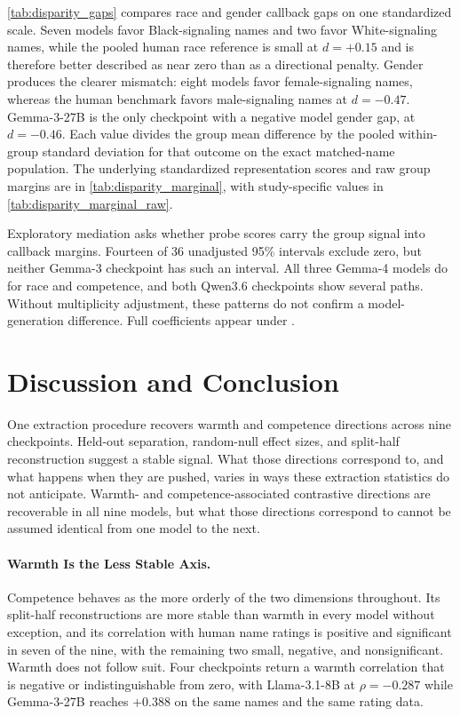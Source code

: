 \documentclass[twocolumn]{article}
\newcommand{\tabledir}{../../results/tables}
\begin{document}
\autoref{tab:disparity_gaps} compares race and gender callback gaps on
one standardized scale. Seven models favor Black-signaling names and two favor
White-signaling names, while the pooled human race reference is small at
$d=+0.15$ and is therefore better described as near zero than as a directional
penalty. Gender produces the clearer mismatch: eight models favor
female-signaling names, whereas the human benchmark favors male-signaling
names at $d=-0.47$. Gemma-3-27B is the only checkpoint with a negative model
gender gap, at $d=-0.46$. Each value divides the group mean difference by the
pooled within-group standard deviation for that outcome on the exact matched-name
population. The
underlying standardized representation scores and raw group margins are in
\autoref{tab:disparity_marginal}, with study-specific values in
\autoref{tab:disparity_marginal_raw}.



Exploratory mediation asks whether probe scores carry the group signal into
callback margins. Fourteen of 36 unadjusted 95\% intervals exclude zero, but
neither Gemma-3 checkpoint has such an interval. All three Gemma-4 models do
for race and competence, and both Qwen3.6 checkpoints show several paths.
Without multiplicity adjustment, these patterns do not confirm a
model-generation difference. Full coefficients appear under
.



\section*{Discussion and Conclusion}

One extraction procedure recovers warmth and competence directions across
nine checkpoints. Held-out separation, random-null effect sizes, and
split-half reconstruction suggest a stable signal. What those directions
correspond to, and what happens when they are pushed, varies in ways these
extraction statistics do not anticipate.
Warmth- and competence-associated contrastive directions are recoverable in
all nine models, but what those directions correspond to cannot be assumed
identical from one model to the next.

\paragraph{Warmth Is the Less Stable Axis.}
Competence behaves as the more orderly of the two dimensions throughout.
Its split-half reconstructions are more stable than warmth in every model
without exception, and its correlation with human name ratings is positive
and significant in seven of the nine, with the remaining two small, negative,
and nonsignificant. Warmth does not follow suit. Four checkpoints return a
warmth correlation that is negative or
indistinguishable from zero, with Llama-3.1-8B at $\rho = -0.287$ while
Gemma-3-27B reaches $+0.388$ on the same names and the same rating data.
\end{document}
